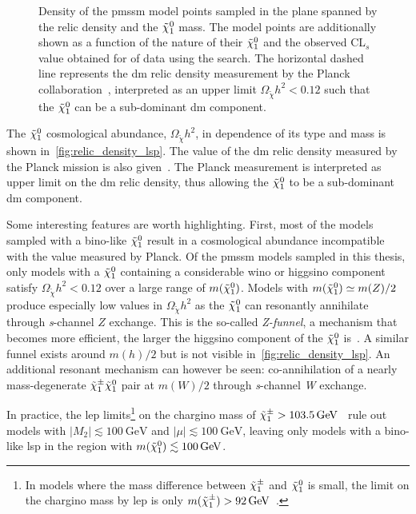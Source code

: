 \begin{figure}
\begin{subfigure}[b]{0.555\linewidth}
	\end{subfigure}\hfill
	\caption{Density of the \gls{pmssm} model points sampled in the plane spanned by the relic density and the $\tilde{\chi}_1^0$ mass. The model points are additionally shown as a function of  the nature of their $\tilde{\chi}_1^0$ and  the observed CL$_s$ value obtained for \onethirtynineifb of data using the \onelepton search. The horizontal dashed line represents the \gls{dm} relic density measurement by the Planck collaboration~\cite{Planck}, interpreted as an upper limit $\Omega_{\tilde{\chi}} h^2 < 0.12$ such that the $\tilde{\chi}_1^0$ can be a sub-dominant \gls{dm} component.}
	\label{fig:relic_density}
\end{figure}

The $\tilde{\chi}_1^0$ cosmological abundance, $\Omega_{\tilde{\chi}} h^2$, in dependence of its type and mass is shown in~\cref{fig:relic_density_lsp}. The value of the \gls{dm} relic density measured by the Planck mission is also given~\cite{Planck}. The Planck measurement is interpreted as upper limit on the \gls{dm} relic density, thus allowing the $\tilde{\chi}_1^0$ to be a sub-dominant \gls{dm} component.

Some interesting features are worth highlighting. First, most of the models sampled with a bino-like $\tilde{\chi}_1^0$ result in a cosmological abundance incompatible with the value measured by Planck.
Of the \gls{pmssm} models sampled in this thesis, only models with a $\tilde{\chi}_1^0$ containing a considerable wino or higgsino component satisfy $\Omega_{\tilde{\chi}} h^2 < 0.12$ over a large range of $m(\tilde{\chi}_1^0)$.
Models with $m(\tilde{\chi}_1^0) \simeq m(Z)/2$ produce especially low values in $\Omega_{\tilde{\chi}} h^2$ as the $\tilde{\chi}_1^0$ can resonantly annihilate through \textit{s}-channel $Z$ exchange. This is the so-called \textit{Z-funnel}, a mechanism that becomes more efficient, the larger the higgsino component of the $\tilde{\chi}_1^0$ is~\cite{Cabrera:2016wwr}.
A similar funnel exists around $m(h)/2$ but is not visible in~\cref{fig:relic_density_lsp}. An additional resonant mechanism can however be seen: co-annihilation of a nearly mass-degenerate $\tilde{\chi}_1^\pm\tilde{\chi}_1^0$ pair at $m(W)/2$ through \textit{s}-channel \textit{W} exchange.

In practice, the \gls{lep} limits\footnote{In models where the mass difference between $\tilde{\chi}_1^\pm$ and $\tilde{\chi}_1^0$ is small, the limit on the chargino mass by \gls{lep} is only $m(\charg) > \SI{92}{\GeV}$~\cite{lep_susy_results}.} on the chargino mass of $\charg > \SI{103.5}{\GeV}$~\cite{lep_susy_results} rule out models with $\vert M_2 \vert \lesssim \SI{100}{\GeV}$ and $\vert \mu \vert \lesssim \SI{100}{\GeV}$, leaving only models with a bino-like \gls{lsp} in the region with $m(\lsp)\lesssim \SI{100}{\GeV}$.

